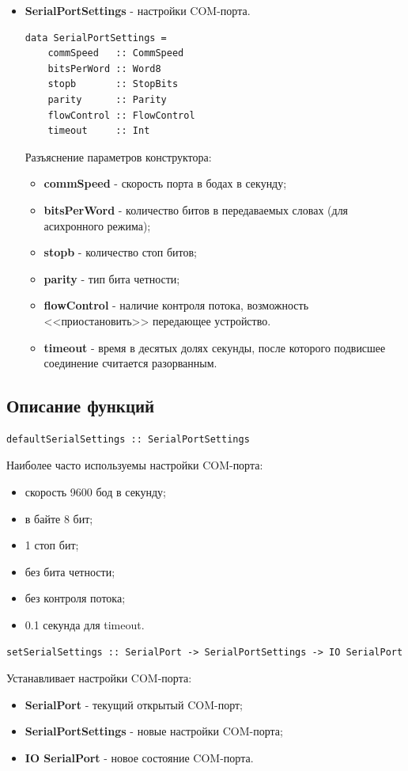 \documentclass[russian,utf8,simple,emptystyle]{eskdtext}
\begin{document}
\begin{itemize}
\item \textbf{SerialPortSettings} - настройки COM-порта.
\begin{lstlisting}
data SerialPortSettings =
	commSpeed   :: CommSpeed
	bitsPerWord :: Word8
	stopb       :: StopBits
	parity      :: Parity
	flowControl :: FlowControl
	timeout     :: Int
\end{lstlisting}
Разъяснение параметров конструктора:
\begin{itemize}
\item \textbf{commSpeed} - скорость порта в бодах в секунду;
\item \textbf{bitsPerWord} - количество битов в передаваемых словах (для асихронного режима);
\item \textbf{stopb} - количество стоп битов;
\item \textbf{parity} - тип бита четности;
\item \textbf{flowControl} - наличие контроля потока, возможность <<приостановить>> передающее устройство.
\item \textbf{timeout} - время в десятых долях секунды, после которого подвисшее соединение считается разорванным.
\end{itemize}
\end{itemize}

\subsection{Описание функций}

\begin{lstlisting}
defaultSerialSettings :: SerialPortSettings
\end{lstlisting}
Наиболее часто используемы настройки COM-порта:
\begin{itemize}
\item скорость 9600 бод в секунду;
\item в байте 8 бит;
\item 1 стоп бит;
\item без бита четности;
\item без контроля потока;
\item 0.1 секунда для timeout.
\end{itemize}

\begin{lstlisting}
setSerialSettings :: SerialPort -> SerialPortSettings -> IO SerialPort
\end{lstlisting}
Устанавливает настройки COM-порта:
\begin{itemize}
\item \textbf{SerialPort} - текущий открытый COM-порт;
\item \textbf{SerialPortSettings} - новые настройки COM-порта;
\item \textbf{IO SerialPort} - новое состояние COM-порта.
\end{itemize}
\end{document}
